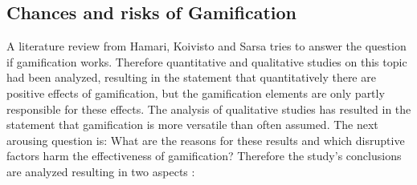 \newpage

\subsection{Chances and risks of Gamification}
\label{sec:theoryBe}

A literature review from Hamari, Koivisto and Sarsa \cite{hamariDoesGamificationWork2014} tries to answer the question if gamification works. Therefore quantitative and qualitative studies on this topic had been analyzed, resulting in the statement that quantitatively there are positive effects of gamification, but the gamification elements are only partly responsible for these effects. The analysis of qualitative studies has resulted in the statement that gamification is more versatile than often assumed. The next arousing question is: What are the reasons for these results and which disruptive factors harm the effectiveness of gamification? Therefore the study's conclusions are analyzed resulting in two aspects \cite[p. 3029, 3030]{hamariDoesGamificationWork2014}:
